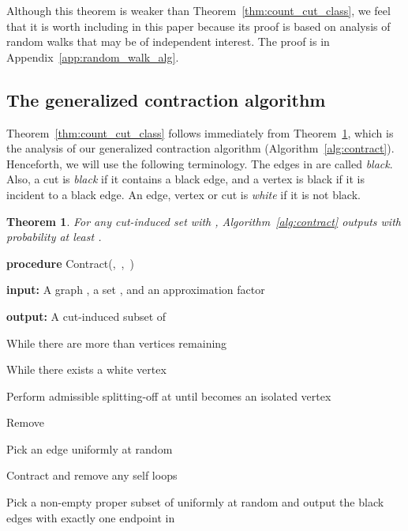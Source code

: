 \documentclass[11pt]{article}
\numberwithin{equation}{section}
\newenvironment{alg}{
    \begin{list}{}{
        \setlength{\itemsep}{2pt}
        \setlength{\parsep}{0pt}
        \setlength{\parskip}{0pt}
        \setlength{\topsep}{1pt}
    }
}
{
    \end{list}
}
\newtheorem{theorem}{Theorem}[section]
\newcommand{\newterm}[1]{\textit{#1}}
\newcommand{\AlgorithmName}[1]{\label{alg:#1}}
\newcommand{\Algorithm}[1]{Algorithm~\ref{alg:#1}}
\newcommand{\Appendix}[1]{Appendix~\ref{app:#1}}
\newcommand{\TheoremName}[1]{\label{thm:#1}}
\newcommand{\Theorem}[1]{Theorem~\ref{thm:#1}}
\begin{document}
Although this theorem is weaker than \Theorem{count_cut_class},
we feel that it is worth including in this paper because its proof is based on analysis of
random walks that may be of independent interest.
The proof is in \Appendix{random_walk_alg}.




\subsection{The generalized contraction algorithm}

\Theorem{count_cut_class} follows immediately from \Theorem{contract_with_split},
which is the analysis of our generalized contraction algorithm
(\Algorithm{contract}).
Henceforth, we will use the following terminology.
The edges in  are called \newterm{black}.
Also, a cut is \newterm{black} if it contains a black edge,
and a vertex is black if it is incident to a black edge.
An edge, vertex or cut is \newterm{white} if it is not black.



\begin{theorem}
\TheoremName{contract_with_split}
For any cut-induced set  with ,
\Algorithm{contract} outputs  with probability at least .
\end{theorem}

\begin{algorithm}
\begin{alg}
\item	\textbf{procedure} Contract(,\, ,\, )
\item	\textbf{input:} A graph , a set , and an approximation factor 
\item	\textbf{output:} A cut-induced subset of 
\item	While there are more than  vertices remaining
    \begin{alg}
    \item	While there exists a white vertex 
        \begin{alg}
        \item   Perform admissible splitting-off at  until  becomes an isolated vertex
        \item   Remove 
        \end{alg}
    \item	Pick an edge  uniformly at random
    \item	Contract  and remove any self loops
    \end{alg}
\item	Pick a non-empty proper subset  of  uniformly at random
        and output the black edges with exactly one endpoint in 
\end{alg}
\caption{An algorithm for finding a small cut-induced set by splitting off white vertices.}
\AlgorithmName{contract}
\end{algorithm}
\end{document}

